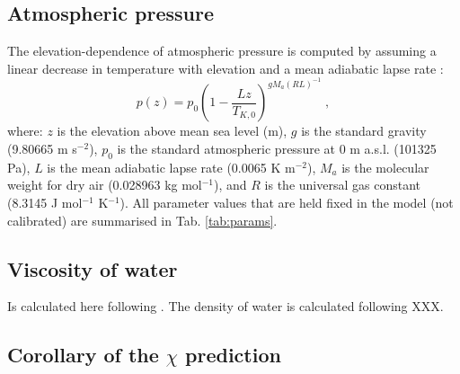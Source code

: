 \documentclass{myreport}
\begin{document}
\subsection{Atmospheric pressure}
\label{sec:press}
The elevation-dependence of atmospheric pressure is computed by assuming a linear decrease in temperature with elevation and a mean adiabatic lapse rate \citep{berberan97}:
\begin{equation}
\label{eq:pz}
    p(z) = p_0 \left( 
    	1 - \frac{L z}{T_{K,0}} 
    \right)^{g M_a (R L)^{-1}} \;,
\end{equation} 
where: $z$ is the elevation above mean sea level (m), $g$ is the standard gravity (9.80665 m s$^{-2}$), $p_0$ is the standard atmospheric pressure at 0 m a.s.l. (101325 Pa), $L$ is the mean adiabatic lapse rate (0.0065 K m$^{-2}$), $M_a$ is the molecular weight for dry air (0.028963 kg mol$^{-1}$), and $R$ is the universal gas constant (8.3145 J mol$^{-1}$ K$^{-1}$). All parameter values that are held fixed in the model (not calibrated) are summarised in Tab. \ref{tab:params}.

\subsection{Viscosity of water}
Is calculated here following \cite{huber09}. The density of water is calculated following XXX.

\subsection{Corollary of the $\chi$ prediction}
\label{sec:corollary}
\end{document}
